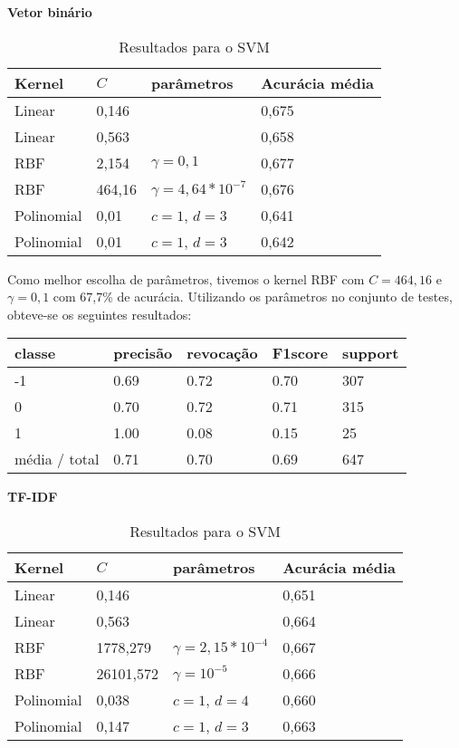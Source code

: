 \textbf{Vetor binário}

\begin{table}[H]
	\centering
	\caption{Resultados para o SVM}
	\begin{tabular}{l l l l}
		\hline
		Kernel & $C$ & parâmetros & Acurácia média \\
		\hline
		Linear & 0,146 & & 0,675 \\
		\hline
		Linear & 0,563 & & 0,658 \\
		\hline
		RBF & 2,154 & $\gamma = 0,1$ & 0,677 \\
		\hline
		RBF & 464,16 & $\gamma = 4,64*10^{-7}$ & 0,676 \\
		\hline
		Polinomial & 0,01 & $c = 1$, $d = 3$ & 0,641 \\
		\hline
		Polinomial & 0,01 & $c = 1$, $d = 3$ & 0,642 \\
		\hline
	\end{tabular}
\end{table}

Como melhor escolha de parâmetros, tivemos o kernel RBF com $C = 464,16$ e $\gamma = 0,1$ com
67,7\% de acurácia. Utilizando os parâmetros no conjunto de testes, obteve-se os seguintes
resultados:

\begin{table}[H]
	\centering
	\begin{tabular}{l | l | l | l | l}
		\hline
		classe  	&	precisão  &  revocação &  F1\-score &  support \\
		\hline
         -1   &    0.69  &    0.72   &   0.70   &    307 \\
         \hline
          0   &    0.70   &   0.72   &   0.71    &   315 \\
          \hline
          1   &    1.00   &   0.08   &   0.15    &    25 \\
		\hline
		média / total   &    0.71   &   0.70   &   0.69   &    647 \\
		\hline
	\end{tabular}
\end{table}

\textbf{TF-IDF}

\begin{table}[H]
	\centering
	\caption{Resultados para o SVM}
	\begin{tabular}{l l l l}
		\hline
		Kernel & $C$ & parâmetros & Acurácia média \\
		\hline
		Linear & 0,146 & & 0,651 \\
		\hline
		Linear & 0,563 & & 0,664 \\
		\hline
		RBF & 1778,279 & $\gamma = 2,15*10^{-4}$ & 0,667 \\
		\hline
		RBF & 26101,572 & $\gamma = 10^{-5}$ & 0,666 \\
		\hline
		Polinomial & 0,038 & $c = 1$, $d = 4$ & 0,660 \\
		\hline
		Polinomial & 0,147 & $c = 1$, $d = 3$ & 0,663 \\
		\hline
	\end{tabular}
\end{table}

